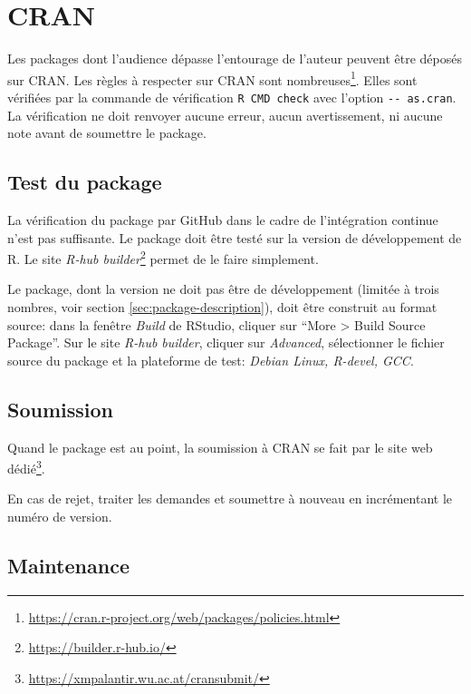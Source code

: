 \documentclass[
  11pt,
  french,
  a4paper,
  extrafontsizes,onecolumn,openright
  ]{memoir}
\begin{document}
\hypertarget{cran}{%
\section{CRAN}\label{cran}}

Les packages dont l'audience dépasse l'entourage de l'auteur peuvent être déposés sur CRAN.
Les règles à respecter sur CRAN sont nombreuses\footnote{\url{https://cran.r-project.org/web/packages/policies.html}}. Elles sont vérifiées par la commande de vérification \texttt{R\ CMD\ check} avec l'option \texttt{-\/-\ as.cran}.
La vérification ne doit renvoyer aucune erreur, aucun avertissement, ni aucune note avant de soumettre le package.

\hypertarget{test-du-package}{%
\subsection{Test du package}\label{test-du-package}}

La vérification du package par GitHub dans le cadre de l'intégration continue n'est pas suffisante.
Le package doit être testé sur la version de développement de R.
Le site \emph{R-hub builder}\footnote{\url{https://builder.r-hub.io/}} permet de le faire simplement.

Le package, dont la version ne doit pas être de développement (limitée à trois nombres, voir section \ref{sec:package-description}), doit être construit au format source: dans la fenêtre \emph{Build} de RStudio, cliquer sur ``More \textgreater{} Build Source Package''.
Sur le site \emph{R-hub builder}, cliquer sur \emph{Advanced}, sélectionner le fichier source du package et la plateforme de test: \emph{Debian Linux, R-devel, GCC}.

\hypertarget{soumission}{%
\subsection{Soumission}\label{soumission}}

Quand le package est au point, la soumission à CRAN se fait par le site web dédié\footnote{\url{https://xmpalantir.wu.ac.at/cransubmit/}}.

En cas de rejet, traiter les demandes et soumettre à nouveau en incrémentant le numéro de version.

\hypertarget{maintenance}{%
\subsection{Maintenance}\label{maintenance}}
\end{document}
